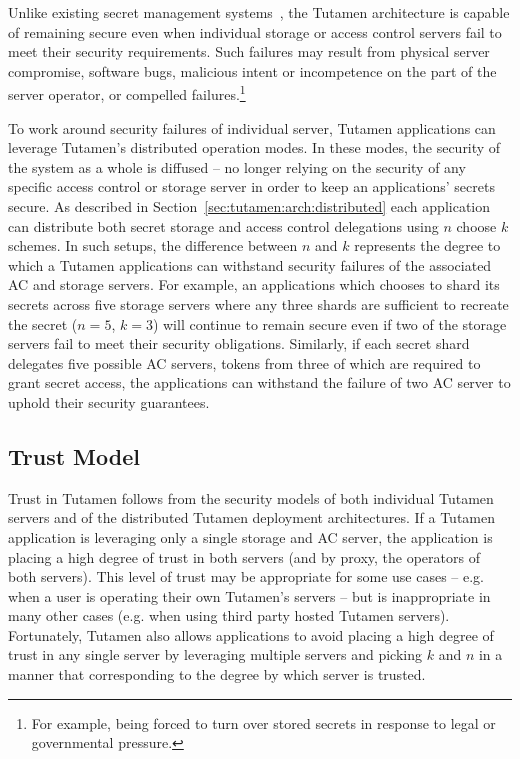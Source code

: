 Unlike existing secret management systems~\cite{vault, confidant,
  keywhiz}, the Tutamen architecture is capable of remaining secure
even when individual storage or access control servers fail to meet
their security requirements. Such failures may result from physical
server compromise, software bugs, malicious intent or incompetence on
the part of the server operator, or compelled failures.\footnote{For
  example, being forced to turn over stored secrets in response to
  legal or governmental pressure.}

To work around security failures of individual server, Tutamen
applications can leverage Tutamen's distributed operation modes. In
these modes, the security of the system as a whole is diffused -- no
longer relying on the security of any specific access control or
storage server in order to keep an applications' secrets secure. As
described in Section~\ref{sec:tutamen:arch:distributed} each
application can distribute both secret storage and access control
delegations using $n$ choose $k$ schemes. In such setups, the
difference between $n$ and $k$ represents the degree to which a
Tutamen applications can withstand security failures of the associated
AC and storage servers. For example, an applications which chooses to
shard its secrets across five storage servers where any three shards
are sufficient to recreate the secret ($n=5$, $k=3$) will continue to
remain secure even if two of the storage servers fail to meet their
security obligations. Similarly, if each secret shard delegates five
possible AC servers, tokens from three of which are required to grant
secret access, the applications can withstand the failure of two AC
server to uphold their security guarantees.


\subsection{Trust Model}

Trust in Tutamen follows from the security models of both individual
Tutamen servers and of the distributed Tutamen deployment
architectures. If a Tutamen application is leveraging only a single
storage and AC server, the application is placing a high degree of
trust in both servers (and by proxy, the operators of both
servers). This level of trust may be appropriate for some use cases --
e.g. when a user is operating their own Tutamen's servers -- but is
inappropriate in many other cases (e.g. when using third party hosted
Tutamen servers). Fortunately, Tutamen also allows applications to
avoid placing a high degree of trust in any single server by
leveraging multiple servers and picking $k$ and $n$ in a manner that
corresponding to the degree by which server is trusted.


